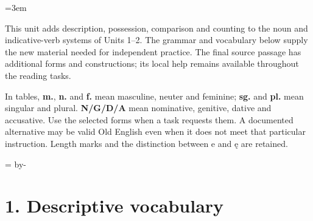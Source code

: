 \newcommand{\runningtitle}{Unit 3. Adjectives and number}

\emergencystretch=3em
\newcommand{\itempara}[2]{\par\addvspace{3pt}\noindent\hangindent=1.8em\hangafter=1\makebox[1.8em][l]{#1.}#2\par}
\newcommand{\reserve}[1]{\par\penalty-100\begingroup\dimen0=\pagegoal\advance\dimen0 by-\pagetotal\ifdim\dimen0<#1\newpage\fi\endgroup}

\raggedright
{}

This unit adds description, possession, comparison and counting to the noun and indicative-verb systems of Units 1–2. The grammar and vocabulary below supply the new material needed for independent practice. The final source passage has additional forms and constructions; its local help remains available throughout the reading tasks.

In tables, \textbf{m.}, \textbf{n.} and \textbf{f.} mean masculine, neuter and feminine; \textbf{sg.} and \textbf{pl.} mean singular and plural. \textbf{N/\allowbreak{}G/\allowbreak{}D/\allowbreak{}A} mean nominative, genitive, dative and accusative. Use the selected forms when a task requests them. A documented alternative may be valid Old English even when it does not meet that particular instruction. Length marks and the distinction between e and ę are retained.

\reserve{7\baselineskip}
\section*{1. Descriptive vocabulary}

